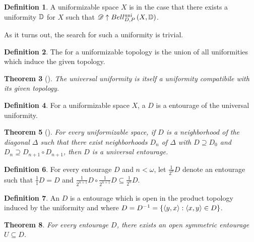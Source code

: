 \documentclass{amsart}
\newtheorem{theorem}{Theorem}[section]
\theoremstyle{definition}
\newtheorem{definition}[theorem]{Definition}
\begin{document}
  \begin{definition}
    A uniformizable space \(X\) is 
    in the case that there exists a uniformity
    \(\mathbb{D}\) for \(X\) such that \(\mathscr{D}\uparrow Bell_{D,P}^{\textrm{uni}}\left({X,\mathbb{D}}\right)\).
  \end{definition}

  As it turns out, the search for such a uniformity is trivial.

  \begin{definition}
    The  for a uniformizable topology is the
    union of all uniformities which induce the given topology.
  \end{definition}

  \begin{theorem}[\cite{MR2048350}]
    The universal uniformity is itself a uniformity compatibile with
    its given topology.
  \end{theorem}

  \begin{definition}
    For a uniformizable space \(X\), a  \(D\) is a
    entourage of the universal uniformity.
  \end{definition}

  \begin{theorem}[\cite{MR2048350}]
    For every uniformizable space, if \(D\) is a neighborhood of the diagonal
    \(\Delta\)  such that there exist neighborhoods \(D_n\) of \(\Delta\) with
    \(D\supseteq D_0\) and
    \(D_n \supseteq D_{n+1}\circ D_{n+1}\), then \(D\) is a
    universal entourage.
  \end{theorem}

  \begin{definition}
    For every entourage \(D\) and \(n<\omega\), let \(\frac{1}{2^n}D\)
    denote an entourage such that \(\frac{1}{1}D=D\) and
    \(\frac{1}{2^{n+1}}D\circ\frac{1}{2^{n+1}}D\subseteq\frac{1}{2^n}D\).
  \end{definition}

  \begin{definition}
    An  \(D\) is a entourage
    which is open in the product topology induced by the uniformity and where
    \(D=D^{-1}=\{\langle y,x\rangle:\langle x,y\rangle\in D\}\).
  \end{definition}

  \begin{theorem}
    For every entourage \(D\), there exists an open symmetric
    entourage \(U\subseteq D\).
  \end{theorem}
\end{document}
